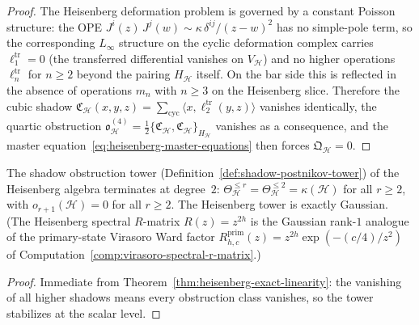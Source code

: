 \begin{proof}
The Heisenberg deformation problem is governed by a constant Poisson
structure: the OPE $J^i(z)\,J^j(w) \sim \kappa\,\delta^{ij}/(z-w)^2$
has no simple-pole term, so the corresponding $L_\infty$ structure on
the cyclic deformation complex carries $\ell_1^{\mathrm{tr}} = 0$
(the transferred differential vanishes on $V_{\mathcal{H}}$) and no
higher operations $\ell_n^{\mathrm{tr}}$ for $n \ge 2$ beyond the
pairing $H_{\mathcal{H}}$ itself. On the bar side this is reflected
in the absence of operations $m_n$ with $n \ge 3$ on the
Heisenberg slice. Therefore the cubic shadow
$\mathfrak{C}_{\mathcal{H}}(x,y,z) =
\sum_{\mathrm{cyc}} \langle x, \ell_2^{\mathrm{tr}}(y,z)\rangle$
vanishes identically, the quartic obstruction
$\mathfrak{o}_{\mathcal{H}}^{(4)} =
\frac{1}{2}\{\mathfrak{C}_{\mathcal{H}},
\mathfrak{C}_{\mathcal{H}}\}_{H_{\mathcal{H}}}$
vanishes as a consequence, and the master
equation~\eqref{eq:heisenberg-master-equations} then forces
$\mathfrak{Q}_{\mathcal{H}} = 0$.
\end{proof}

\begin{corollary}
\label{cor:heisenberg-postnikov-termination}
The shadow obstruction tower
\textup{(}Definition~\textup{\ref{def:shadow-postnikov-tower})}
of the Heisenberg algebra terminates at degree~$2$:
$\Theta_{\mathcal{H}}^{\leq r} = \Theta_{\mathcal{H}}^{\leq 2}
= \kappa(\mathcal{H})$ for all $r \geq 2$,
with $o_{r+1}(\mathcal{H}) = 0$ for all $r \geq 2$.
The Heisenberg tower is exactly Gaussian.
(The Heisenberg spectral $R$-matrix $R(z)=z^{2h}$ is the Gaussian
rank-$1$ analogue of the primary-state Virasoro Ward factor
$R^{\mathrm{prim}}_{h,c}(z)=z^{2h}\exp(-(c/4)/z^2)$ of
Computation~\ref{comp:virasoro-spectral-r-matrix}.)
\end{corollary}

\begin{proof}
Immediate from Theorem~\ref{thm:heisenberg-exact-linearity}:
the vanishing of all higher shadows means
every obstruction class vanishes, so the tower stabilizes
at the scalar level.
\end{proof}

